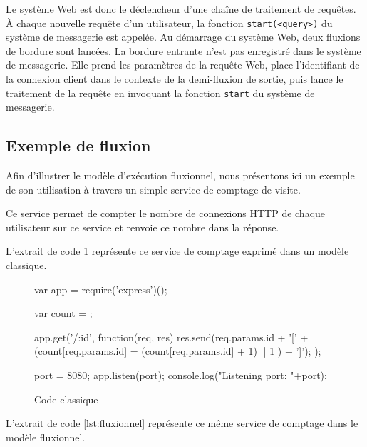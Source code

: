 Le système Web est donc le déclencheur d'une chaîne de traitement de requêtes.
À chaque nouvelle requête d'un utilisateur, la fonction \texttt{start(<query>)} du système de messagerie est appelée.
Au démarrage du système Web, deux fluxions de bordure sont lancées.
La bordure entrante n'est pas enregistré dans le système de messagerie.
Elle prend les paramètres de la requête Web, place l'identifiant de la connexion client dans le contexte de la demi-fluxion de sortie, puis lance le traitement de la requête en invoquant la fonction \texttt{start} du système de messagerie.

\subsection{Exemple de fluxion}

Afin d'illustrer le modèle d'exécution fluxionnel, nous présentons ici un exemple de son utilisation à travers un simple service de comptage de visite.

Ce service permet de compter le nombre de connexions HTTP de chaque utilisateur sur ce service et renvoie ce nombre dans la réponse.

L'extrait de code \ref{lst:classique} représente ce service de comptage exprimé dans un modèle classique.

\begin{figure}
  \begin{code}
  var app = require('express')();

  var count = {};

  app.get('/:id', function(req, res){
    res.send(req.params.id + '[' + (count[req.params.id] = (count[req.params.id] + 1) || 1 ) + ']');
  });

  port = 8080;
  app.listen(port);
  console.log("Listening port: "+port);
  \end{code}
  \caption{Code classique}
  \label{lst:classique}
\end{figure}

L'extrait de code \ref{lst:fluxionnel} représente ce même service de comptage dans le modèle fluxionnel.

